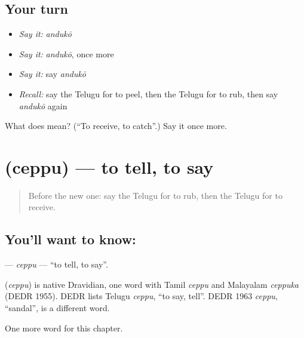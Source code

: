 \subsection*{Your turn}
\begin{itemize}
\raggedright
  \item \emph{Say it:} \emph{andukō}
  \item \emph{Say it:} \emph{andukō}, once more
  \item \emph{Say it:} say \emph{andukō}
  \item \emph{Recall:} say the Telugu for to peel, then the Telugu for to rub, then say \emph{andukō} again
\end{itemize}

\begin{tcolorbox}[breakable,colback=teal!4,colframe=teal!35!black,title={Before you move on}]
What does  mean? (\textquotedblleft{}To receive, to catch\textquotedblright{}.) Say it once more.
\end{tcolorbox}
\section[\texorpdfstring{\te{చెప్పు} (ceppu)}{చెప్పు (ceppu)}]{ (ceppu) — to tell, to say}

\label{lesson:TE-C280-ceppu}



\begin{quote}
Before the new one: say the Telugu for to rub, then the Telugu for to receive.
\end{quote}

\subsection*{You'll want to know: }
\textbf{} — \emph{ceppu} — \textquotedblleft{}to tell, to say\textquotedblright{}.

\begin{cousinweb}
\textbf{} (\emph{ceppu}) is native Dravidian, one word with Tamil \emph{ceppu} and Malayalam \emph{ceppuka} (DEDR 1955). DEDR lists Telugu \emph{ceppu}, \textquotedblleft{}to say, tell\textquotedblright{}. DEDR 1963 \emph{ceppu}, \textquotedblleft{}sandal\textquotedblright{}, is a different word.
\end{cousinweb}

\begin{grammarlens}[title={What you've built}]
One more word for this chapter.
\end{grammarlens}

